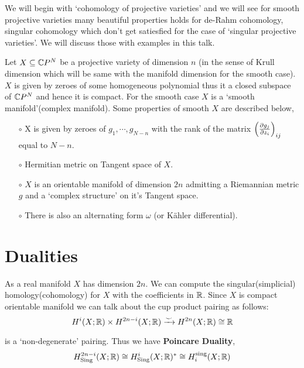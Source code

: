 \documentclass[11pt]{article}
\author{\textbf{Notes By:} \textsc{Trishan Mondal} \\[0.15cm]
   \textbf{Speaker:} \textsc{Suresh Nayak} \\[0.15cm]
  \href{https://www.isibang.ac.in}{Indian Statistical Institute, Bangalore}}
\date{}
\begin{document}
\maketitle

\noindent We will begin with `cohomology of projective varieties' and we will see for smooth projective varieties many beautiful properties holds for de-Rahm cohomology, singular cohomology which don't get satiesfied for the case of `singular projective varieties'. We will discuss those with examples in this talk. 

\vspace*{0.2cm}

\noindent Let $X\subseteq \mathbb{C} P^N$ be a projective variety of dimension $n$ (in the sense of Krull dimension which will be same with the manifold dimension for the smooth case). $X$ is given by zeroes of some homogeneous polynomial thus it a closed subspace of $\mathbb{C} P^N$ and hence it is compact. For the smooth case $X$ is a `smooth manifold'(complex manifold). Some properties of smooth $X$ are described below, 

\begin{itemize}
    \item[$\circ$] X is given by zeroes of $g_1,\cdots,g_{N-n}$ with the rank of the matrix $\qty(\pdv{g_j}{z_i})_{ij}$ equal to $N-n$.
    \item[$\circ$] Hermitian metric on Tangent space of $X$.   
    \item[$\circ$] $X$ is an orientable manifold of dimension $2n$ admitting a Riemannian metric $g$ and a `complex structure' on it's Tangent space. 
    \item[$\circ$] There is also an alternating form $\omega$ (or K\"{a}hler differential). 
\end{itemize}

\section{Dualities}
 As a real manifold $X$ has dimension $2n$. We can compute the singular(simplicial) homology(cohomology) for $X$ with the coefficients in $\mathbb{R}$. Since $X$ is compact orientable manifold we can talk about the cup product pairing as follows: 
\[H^{i}(X;\mathbb{R}) \times H^{2n-i}(X;\mathbb{R}) \xrightarrow{\smile} H^{2n}(X;\mathbb{R}) \cong \mathbb{R}\]

\noindent is a `non-degenerate' pairing. Thus we have \textbf{Poincare Duality}, $$H^{2n-i}_{\text{Sing}}(X;\mathbb{R}) \cong H^{i}_{\text{Sing}}(X;\mathbb{R})^* \cong H_i^{\text{sing}}(X;\mathbb{R})$$
\end{document}
